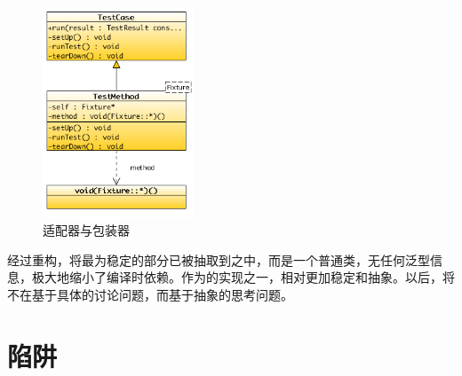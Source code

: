 \begin{content}
\begin{figure}[H]
\centering
\includegraphics[width=0.4\textwidth]{figures/xunit/testcase-adapter.png}
\caption{适配器与包装器}
 \label{fig:testcase-adapter}
\end{figure}

经过重构，将最为稳定的部分已被抽取到之中，而是一个普通类，无任何泛型信息，极大地缩小了编译时依赖。作为的实现之一，相对更加稳定和抽象。以后，将不在基于具体的讨论问题，而基于抽象的思考问题。

\end{content}

\section{陷阱}

